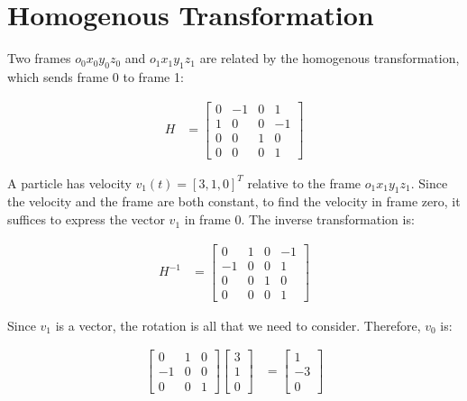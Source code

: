\documentclass{article}
\begin{document}
\section{Homogenous Transformation}

Two frames $o_0 x_0 y_0 z_0$ and $o_1 x_1 y_1 z_1$ are related by
	the homogenous transformation, which sends frame 0 to frame 1:

\begin{align}
H & = \left[ \begin{matrix}
	0 & -1 & 0 & 1 \\
	1 & 0  & 0 & -1 \\
	0 & 0 & 1 & 0 \\
	0 & 0 & 0 & 1 
\end{matrix} \right] \label{eq:def-of-H}
\end{align}

A particle has velocity $v_1(t) = \left[ 3, 1, 0 \right]^T$ relative
	to the frame $o_1 x_1 y_1 z_1$.
Since the velocity and the frame are both constant, to find the velocity
	in frame zero, it suffices to express the vector $v_1$ in frame 0.
The inverse transformation is:

\begin{align*}
H^{-1} & = \left[ \begin{matrix}
	0 & 1 & 0 & -1 \\
	-1 & 0  & 0 & 1 \\
	0 & 0 & 1 & 0 \\
	0 & 0 & 0 & 1 
\end{matrix} \right]
\end{align*}

Since $v_1$ is a vector, the rotation is all that we need to consider.
Therefore, $v_0$ is:

\begin{align*}
\left[ \begin{matrix}
	0 & 1 & 0 \\
	-1 & 0 & 0 \\
	0 & 0 & 1 \end{matrix} \right]
\left[ \begin{matrix}
	3 \\
	1 \\
	0 \end{matrix} \right]
& =
\left[ \begin{matrix}
	1 \\
	-3 \\
	0 \end{matrix} \right]
\end{align*}
\end{document}
